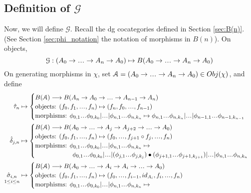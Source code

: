 \subsection{Definition of $\mathcal{G}$}
\label{sec:def_G}
Now, we will define $\mathcal{G}$. 
Recall the dg cocategories defined in Section
\ref{sec:B(n)}. (See Section \ref{sec:phi_notation} 
the notation of morphisms in $B(n)$). On objects, 
$$
\mathcal{G}: (A_0 \to \smdots \to A_n \to A_0)
  \mapsto B(A_0 \to \smdots \to A_n \to A_0)
$$
On generating morphisms in $\chi$, set $\mathcal{A} = 
(A_0 \to \smdots \to A_n \to A_0) \in Obj(\chi)$, and 
define 
\begin{align*}
\hat{\tau}_n
  &\mapsto 
  \begin{cases}
  B(\mathcal{A}) \longrightarrow 
  B(A_n \to A_0 \to \smdots \to A_{n-1} \to A_n) \\
  \textrm{objects: } (f_0,f_1, \smdots, f_n) \mapsto 
  (f_n, f_0, \smdots, f_{n-1}) \\
  \textrm{morphisms: } \phi_{0,1}\smdots \phi_{0,k_0} | \smdots |
	\phi_{n,1}\smdots\phi_{n,k_n} \mapsto 
	\phi_{n,1}\smdots\phi_{n,k_n} | \smdots |
	\phi_{n-1,1}\smdots\phi_{n-1,k_{n-1}}
  \end{cases}\\	
%
\hat{\delta}_{j,n}
  &\mapsto 
  \begin{cases}
  B(\mathcal{A}) \longrightarrow 
  B(A_0 \to \smdots \to A_j\to A_{j+2} 
      \to \smdots \to A_0) \\
  \textrm{objects: } (f_0,f_1, \smdots, f_n) \mapsto 
  (f_0, \smdots,f_{j+1}\circ f_j, \smdots, f_n) \\
  \textrm{morphisms: } \phi_{0,1}\smdots \phi_{0,k_0} | \smdots |
	\phi_{n,1}\smdots\phi_{n,k_n} \mapsto \\
  \phantom{{}morphisms: {}} 
	\phi_{0,1}\smdots \phi_{0,k_0} | \smdots |
	(\phi_{j,1}\smdots \phi_{j,k_j}) \bullet
	(\phi_{j+1,1}\smdots \phi_{j+1,k_{j+1}}) | \smdots |
	\phi_{n,1}\smdots\phi_{n,k_n} 
  \end{cases}\\
%
\underset{1 \leq i \leq n}{\hat{\sigma}_{i,n}}
  &\mapsto 
  \begin{cases}
  B(\mathcal{A}) \longrightarrow 
  B(A_0 \to \smdots \to A_i\to A_i
      \to \smdots \to A_0) \\
  \textrm{objects: } (f_0,f_1, \smdots, f_n) \mapsto 
  (f_0, \smdots,f_{i-1}, id_{A_i}, f_i, \smdots, f_n) \\
  \textrm{morphisms: } \phi_{0,1}\smdots \phi_{0,k_0} | \smdots |
	\phi_{n,1}\smdots\phi_{n,k_n} \mapsto \\

\end{cases}
\end{align*}
